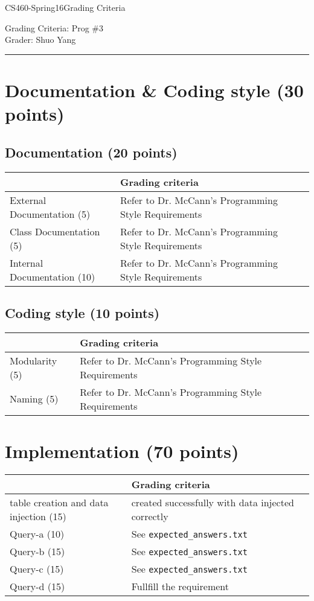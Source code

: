 \documentclass[10pt]{article}
\def\CourseCode{CS460-Spring16}
\def\Category{Grading Criteria}
\def\ProgNo{3}
\def\Grader{Shuo Yang}
\begin{document}
\noindent

\CourseCode \hfill \Category

\begin{center}
Grading Criteria: Prog \#\ProgNo\\
Grader: \Grader\\
\end{center}

\hrule\smallskip

\section{Documentation \& Coding style (30 points)}

\subsection{Documentation (20 points)}

\begin{tabular}{ | l | l | l | }
  \hline
  & Grading criteria \\ \hline
  External Documentation (5) & Refer to Dr. McCann's Programming Style
  Requirements\\ \hline
  Class Documentation (5) & Refer to Dr. McCann's Programming Style
  Requirements \\ \hline
  Internal Documentation (10) & Refer to Dr. McCann's Programming Style
  Requirements \\ \hline
\end{tabular}

\subsection{Coding style (10 points)}

\begin{tabular}{ | l | l | l | }
  \hline
  & Grading criteria \\ \hline
  Modularity (5) & Refer to Dr. McCann's Programming Style
  Requirements \\ \hline
  Naming (5) & Refer to Dr. McCann's Programming Style
  Requirements \\ \hline
\end{tabular}

\section{Implementation (70 points)}

\begin{tabular}{ | l | l | l | }
  \hline
  & Grading criteria \\ \hline
  table creation and data injection (15) & created successfully with
  data injected correctly \\ \hline
  Query-a (10) & See \tt{expected\_answers.txt} \\ \hline
  Query-b (15) & See \tt{expected\_answers.txt} \\ \hline
  Query-c (15) & See \tt{expected\_answers.txt} \\ \hline
  Query-d (15) & Fullfill the requirement \\ \hline
\end{tabular}
\end{document}
